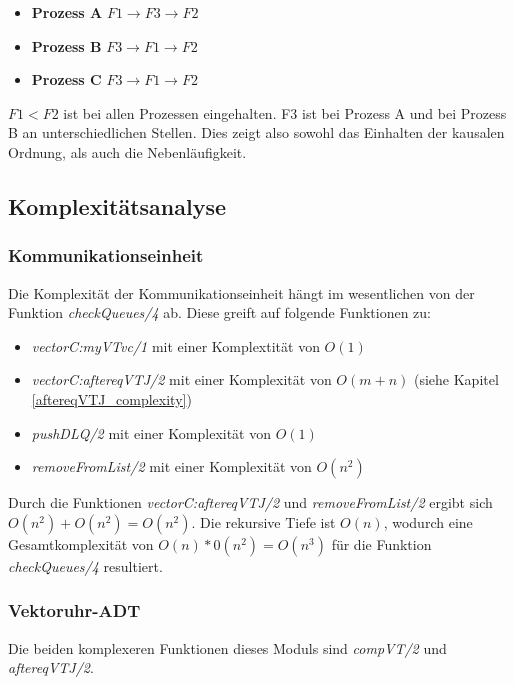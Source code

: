 \begin{itemize}
	\item \textbf{Prozess A}  $F1 \rightarrow F3 \rightarrow F2$
	\item \textbf{Prozess B} $F3 \rightarrow F1 \rightarrow F2$
	\item \textbf{Prozess C} $F3 \rightarrow F1 \rightarrow F2$
\end{itemize}

$F1 < F2$ ist bei allen Prozessen eingehalten. F3 ist bei Prozess A und bei Prozess B an unterschiedlichen Stellen. Dies zeigt also sowohl das Einhalten der kausalen Ordnung, als auch die Nebenläufigkeit.

\subsection{Komplexitätsanalyse}

\subsubsection{Kommunikationseinheit}

Die Komplexität der Kommunikationseinheit hängt im wesentlichen von der Funktion \textit{checkQueues/4} ab. Diese greift auf folgende Funktionen zu:
\begin{itemize}
    \item \textit{vectorC:myVTvc/1} mit einer Komplextität von $O(1)$
    \item \textit{vectorC:aftereqVTJ/2} mit einer Komplexität von $O(m+n)$ (siehe Kapitel \ref{aftereqVTJ_complexity})
    \item \textit{pushDLQ/2} mit einer Komplexität von $O(1)$
    \item \textit{removeFromList/2} mit einer Komplexität von $O(n^2)$
\end{itemize}

Durch die Funktionen \textit{vectorC:aftereqVTJ/2} und \textit{removeFromList/2} ergibt sich $O(n^2)+O(n^2)=O(n^2)$. Die rekursive Tiefe ist $O(n)$, wodurch eine Gesamtkomplexität von $O(n)*0(n^2)=O(n^3)$ für die Funktion \textit{checkQueues/4} resultiert.

\subsubsection{Vektoruhr-ADT}

Die beiden komplexeren Funktionen dieses Moduls sind \textit{compVT/2} und \textit{aftereqVTJ/2}. 

